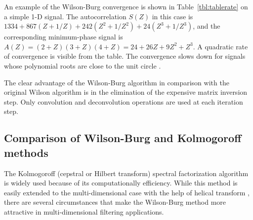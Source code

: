 An example of the Wilson-Burg convergence is shown in
Table~\ref{tbl:tablerate} on a simple 1-D signal. The autocorrelation
$S(Z)$ in this case is $1334 + 867 \left(Z + 1/Z\right) + 242
\left(Z^2 + 1/Z^2\right) + 24 \left(Z^3 + 1/Z^3\right)$, and the
corresponding minimum-phase signal is $A(Z) = (2+Z)(3+Z)(4+Z) = 24 +
26 Z + 9 Z^2 + Z^3$. A quadratic rate of convergence is visible from
the table. The convergence slows down for signals whose polynomial
roots are close to the unit circle \cite[]{mywilson}.

The clear advantage of the Wilson-Burg algorithm in comparison with the
original Wilson algorithm is in the elimination of the expensive matrix
inversion step. Only convolution and deconvolution operations are used at each
iteration step.

\subsection{Comparison of Wilson-Burg and Kolmogoroff methods}
The Kolmogoroff (cepstral or Hilbert transform) spectral factorization
algorithm \cite[]{kolmog,Claerbout.fgdp.76,oppenheim} is widely used because of
its computationally efficiency. While this method is easily extended to the
multi-dimensional case with the help of helical transform
\cite[]{SEG-1999-16751678}, there are several circumstances that make the
Wilson-Burg method more attractive in multi-dimensional filtering
applications.

